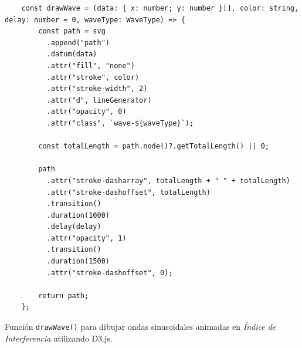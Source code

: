 \begin{ifalgorithm}[H]
    \begin{lstlisting}
    const drawWave = (data: { x: number; y: number }[], color: string, delay: number = 0, waveType: WaveType) => {
        const path = svg
          .append("path")
          .datum(data)
          .attr("fill", "none")
          .attr("stroke", color)
          .attr("stroke-width", 2)
          .attr("d", lineGenerator)
          .attr("opacity", 0)
          .attr("class", `wave-${waveType}`);

        const totalLength = path.node()?.getTotalLength() || 0;

        path
          .attr("stroke-dasharray", totalLength + " " + totalLength)
          .attr("stroke-dashoffset", totalLength)
          .transition()
          .duration(1000)
          .delay(delay)
          .attr("opacity", 1)
          .transition()
          .duration(1500)
          .attr("stroke-dashoffset", 0);

        return path;
    };
    \end{lstlisting}
    \caption{Función \texttt{drawWave()} para dibujar ondas sinusoidales animadas en \textit{Índice de Interferencia} utilizando D3.js.}
    \label{alg:draw_wave}
\end{ifalgorithm}


